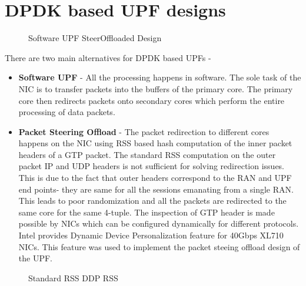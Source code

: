 
\section{DPDK based UPF designs}
\begin{figure}[htbp]
	\centering

	\caption{ Software UPF   SteerOffloaded Design}
	\label{figure:DesignAB}
\end{figure}

There are two main alternatives for DPDK based UPFs -
\begin{itemize}
	\item \textbf{Software UPF} - All the processing happens in software. The sole task of
	      the NIC is to transfer packets into the buffers of the primary core. The primary core then
	      redirects packets onto secondary cores which perform the entire processing of data packets.
	\item \textbf{Packet Steering Offload} - The packet redirection to different cores happens on the NIC using RSS based hash
	      computation of the inner packet headers of a GTP packet. The standard RSS computation on the outer packet IP and UDP headers is not sufficient for solving redirection issues. This is due to the fact that outer headers correspond to the RAN and UPF end points- they are same for all the sessions emanating from a single RAN. This leads to poor randomization and all the packets are redirected to the same core for the same 4-tuple. The inspection of GTP header is made possible by NICs which can be configured dynamically for different protocols. Intel provides Dynamic Device Personalization feature for 40Gbps XL710 NICs. This feature was used to implement the packet steeing offload design of the UPF.
\end{itemize}
\begin{figure}[htbp]
	\centering


	\caption{ Standard RSS   DDP RSS}
	\label{figure:HashFields}
\end{figure}

